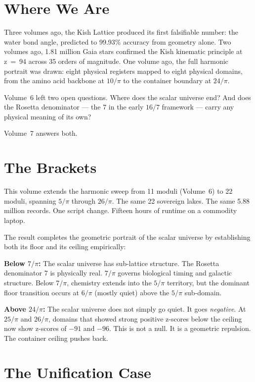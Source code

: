 \documentclass[11pt, letterpaper, openany]{book}
\begin{document}
\section*{Where We Are}

Three volumes ago, the Kish Lattice produced its first falsifiable number: the water
bond angle, predicted to 99.93\% accuracy from geometry alone. Two volumes ago, 1.81
million Gaia stars confirmed the Kish kinematic principle at z~=~94 across 35 orders of
magnitude. One volume ago, the full harmonic portrait was drawn: eight physical registers
mapped to eight physical domains, from the amino acid backbone at $10/\pi$ to the
container boundary at $24/\pi$.

Volume~6 left two open questions. Where does the scalar universe end? And does the
Rosetta denominator --- the 7 in the early $16/7$ framework --- carry any physical
meaning of its own?

Volume~7 answers both.

\section*{The Brackets}

This volume extends the harmonic sweep from 11 moduli (Volume~6) to 22 moduli, spanning
$5/\pi$ through $26/\pi$. The same 22 sovereign lakes. The same 5.88 million records.
One script change. Fifteen hours of runtime on a commodity laptop.

The result completes the geometric portrait of the scalar universe by establishing both
its floor and its ceiling empirically:

\textbf{Below $7/\pi$:} The scalar universe has sub-lattice structure. The Rosetta
denominator 7 is physically real. $7/\pi$ governs biological timing and galactic
structure. Below $7/\pi$, chemistry extends into the $5/\pi$ territory, but the dominant
floor transition occurs at $6/\pi$ (mostly quiet) above the $5/\pi$ sub-domain.

\textbf{Above $24/\pi$:} The scalar universe does not simply go quiet. It goes
\emph{negative}. At $25/\pi$ and $26/\pi$, domains that showed strong positive z-scores
below the ceiling now show z-scores of $-91$ and $-96$. This is not a null. It is a
geometric repulsion. The container ceiling pushes back.

\section*{The Unification Case}
\end{document}
